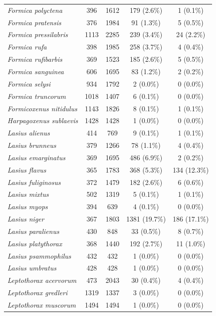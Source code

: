\documentclass[preprint,final,times,12pt,3p]{elsarticle}
\begin{document}
\begin{longtable}{ l c c c c}
	\emph{Formica polyctena} & 396 & 1612 & 179 (2.6\%) & 1 (0.1\%) \\
	\emph{Formica pratensis} & 376 & 1984 & 91 (1.3\%) & 5 (0.5\%) \\
	\emph{Formica pressilabris} & 1113 & 2285 & 239 (3.4\%) & 24 (2.2\%) \\
	\emph{Formica rufa} & 398 & 1985 & 258 (3.7\%) & 4 (0.4\%) \\
	\emph{Formica rufibarbis} & 369 & 1523 & 185 (2.6\%) & 5 (0.5\%) \\
	\emph{Formica sanguinea} & 606 & 1695 & 83 (1.2\%) & 2 (0.2\%) \\
	\emph{Formica selysi} & 934 & 1792 & 2 (0.0\%) & 0 (0.0\%) \\
	\emph{Formica truncorum} & 1018 & 1407 & 6 (0.1\%) & 0 (0.0\%) \\
	\emph{Formicoxenus nitidulus} & 1143 & 1826 & 8 (0.1\%) & 1 (0.1\%) \\
	\emph{Harpagoxenus sublaevis} & 1428 & 1428 & 1 (0.0\%) & 0 (0.0\%) \\
	\emph{Lasius alienus} & 414 & 769 & 9 (0.1\%) & 1 (0.1\%) \\
	\emph{Lasius brunneus} & 379 & 1266 & 78 (1.1\%) & 4 (0.4\%) \\
	\emph{Lasius emarginatus} & 369 & 1695 & 486 (6.9\%) & 2 (0.2\%) \\
	\emph{Lasius flavus} & 365 & 1783 & 368 (5.3\%) & 134 (12.3\%) \\
	\emph{Lasius fuliginosus} & 372 & 1479 & 182 (2.6\%) & 6 (0.6\%) \\
	\emph{Lasius mixtus} & 502 & 1319 & 5 (0.1\%) & 1 (0.1\%) \\
	\emph{Lasius myops} & 394 & 639 & 4 (0.1\%) & 0 (0.0\%) \\
	\emph{Lasius niger} & 367 & 1803 & 1381 (19.7\%) & 186 (17.1\%) \\
	\emph{Lasius paralienus} & 430 & 848 & 33 (0.5\%) & 8 (0.7\%) \\
	\emph{Lasius platythorax} & 368 & 1440 & 192 (2.7\%) & 11 (1.0\%) \\
	\emph{Lasius psammophilus} & 432 & 432 & 1 (0.0\%) & 0 (0.0\%) \\
	\emph{Lasius umbratus} & 428 & 428 & 1 (0.0\%) & 0 (0.0\%) \\
	\emph{Leptothorax acervorum} & 473 & 2043 & 30 (0.4\%) & 4 (0.4\%) \\
	\emph{Leptothorax gredleri} & 1319 & 1337 & 3 (0.0\%) & 0 (0.0\%) \\
	\emph{Leptothorax muscorum} & 1494 & 1494 & 1 (0.0\%) & 0 (0.0\%) \\

\end{longtable}
\end{document}
